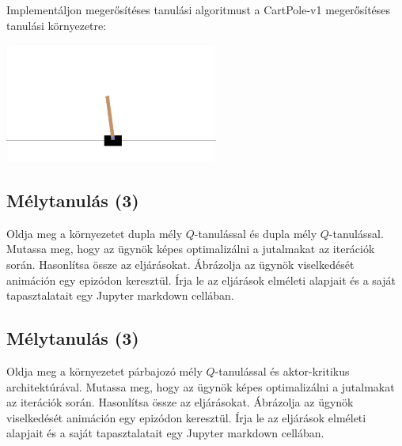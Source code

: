 \documentclass[english]{article}
\begin{document}
Implementáljon megerősítéses tanulási algoritmust a CartPole-v1 megerősítéses tanulási környezetre:

\begin{center}
\includegraphics[width=7cm, keepaspectratio]{images/cartpole.jpg}
\end{center}

\subsection{Mélytanulás (3)}

Oldja meg a környezetet dupla mély $Q$-tanulással és dupla mély $Q$-tanulással. Mutassa meg, hogy az ügynök képes optimalizálni a jutalmakat az iterációk során. Hasonlítsa össze az eljárásokat. Ábrázolja az ügynök viselkedését animáción egy epizódon keresztül. Írja le az eljárások elméleti alapjait és a saját tapasztalatait egy Jupyter markdown cellában. 

\subsection{Mélytanulás (3)}

Oldja meg a környezetet párbajozó mély $Q$-tanulással és aktor-kritikus architektúrával. Mutassa meg, hogy az ügynök képes optimalizálni a jutalmakat az iterációk során. Hasonlítsa össze az eljárásokat. Ábrázolja az ügynök viselkedését animáción egy epizódon keresztül. Írja le az eljárások elméleti alapjait és a saját tapasztalatait egy Jupyter markdown cellában. 
\end{document}
